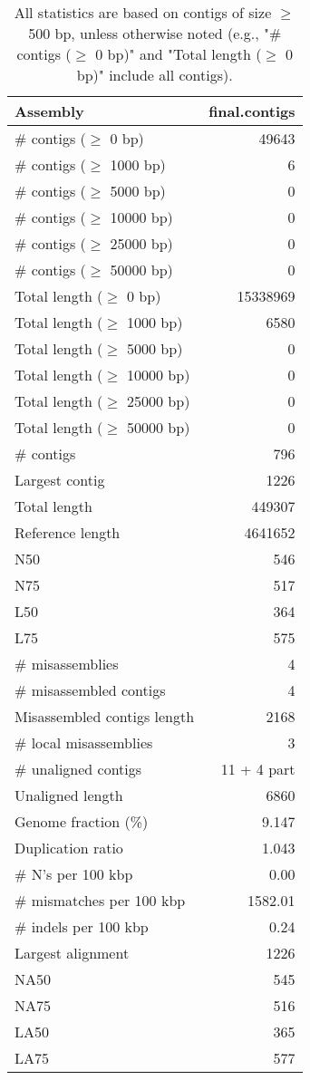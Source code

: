 \documentclass[12pt,a4paper]{article}
\begin{document}
\begin{table}[ht]
\begin{center}
\caption{All statistics are based on contigs of size $\geq$ 500 bp, unless otherwise noted (e.g., "\# contigs ($\geq$ 0 bp)" and "Total length ($\geq$ 0 bp)" include all contigs).}
\begin{tabular}{|l*{1}{|r}|}
\hline
Assembly & final.contigs \\ \hline
\# contigs ($\geq$ 0 bp) & 49643 \\ \hline
\# contigs ($\geq$ 1000 bp) & 6 \\ \hline
\# contigs ($\geq$ 5000 bp) & 0 \\ \hline
\# contigs ($\geq$ 10000 bp) & 0 \\ \hline
\# contigs ($\geq$ 25000 bp) & 0 \\ \hline
\# contigs ($\geq$ 50000 bp) & 0 \\ \hline
Total length ($\geq$ 0 bp) & 15338969 \\ \hline
Total length ($\geq$ 1000 bp) & 6580 \\ \hline
Total length ($\geq$ 5000 bp) & 0 \\ \hline
Total length ($\geq$ 10000 bp) & 0 \\ \hline
Total length ($\geq$ 25000 bp) & 0 \\ \hline
Total length ($\geq$ 50000 bp) & 0 \\ \hline
\# contigs & 796 \\ \hline
Largest contig & 1226 \\ \hline
Total length & 449307 \\ \hline
Reference length & 4641652 \\ \hline
N50 & 546 \\ \hline
N75 & 517 \\ \hline
L50 & 364 \\ \hline
L75 & 575 \\ \hline
\# misassemblies & 4 \\ \hline
\# misassembled contigs & 4 \\ \hline
Misassembled contigs length & 2168 \\ \hline
\# local misassemblies & 3 \\ \hline
\# unaligned contigs & 11 + 4 part \\ \hline
Unaligned length & 6860 \\ \hline
Genome fraction (\%) & 9.147 \\ \hline
Duplication ratio & 1.043 \\ \hline
\# N's per 100 kbp & 0.00 \\ \hline
\# mismatches per 100 kbp & 1582.01 \\ \hline
\# indels per 100 kbp & 0.24 \\ \hline
Largest alignment & 1226 \\ \hline
NA50 & 545 \\ \hline
NA75 & 516 \\ \hline
LA50 & 365 \\ \hline
LA75 & 577 \\ \hline
\end{tabular}
\end{center}
\end{table}
\end{document}
